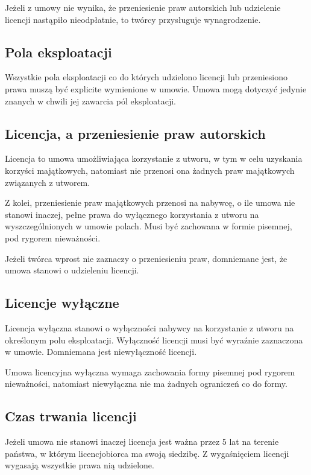 \documentclass{article}
\begin{document}
Jeżeli z umowy nie wynika, że przeniesienie praw autorskich lub udzielenie licencji nastąpiło nieodpłatnie, to twórcy przysługuje wynagrodzenie.

\subsection{Pola eksploatacji}

Wszystkie pola eksploatacji co do których udzielono licencji lub przeniesiono prawa muszą być explicite wymienione w umowie. Umowa mogą dotyczyć jedynie znanych w chwili jej zawarcia pól eksploatacji.

\subsection{Licencja, a przeniesienie praw autorskich}

Licencja to umowa umożliwiająca korzystanie z utworu, w tym w celu uzyskania korzyści majątkowych, natomiast nie przenosi ona żadnych praw majątkowych związanych z utworem.

Z kolei, przeniesienie praw majątkowych przenosi na nabywcę, o ile umowa nie stanowi inaczej, pełne prawa do wyłącznego korzystania z utworu na wyszczególnionych w umowie polach. Musi być zachowana w formie pisemnej, pod rygorem nieważności.

Jeżeli twórca wprost nie zaznaczy o przeniesieniu praw, domniemane jest, że umowa stanowi o udzieleniu licencji.

\subsection{Licencje wyłączne}

Licencja wyłączna stanowi o wyłączności nabywcy na korzystanie z utworu na określonym polu eksploatacji. Wyłączność licencji musi być wyraźnie zaznaczona w umowie. Domniemana jest niewyłączność licencji.

Umowa licencyjna wyłączna wymaga zachowania formy pisemnej pod rygorem nieważności, natomiast niewyłączna nie ma żadnych ograniczeń co do formy.

\subsection{Czas trwania licencji}

Jeżeli umowa nie stanowi inaczej licencja jest ważna przez 5 lat na terenie państwa, w którym licencjobiorca ma swoją siedzibę. Z wygaśnięciem licencji wygasają wszystkie prawa nią udzielone.
\end{document}
